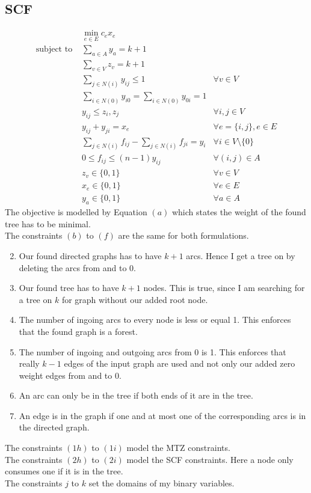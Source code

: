 \documentclass[11pt]{article}
\begin{document}
\subsection{SCF}
\begin{subequations}
\begin{align}
 &\min_{e \in E} c_e x_e&  \\
\text{subject to }  &\sum_{a \in A} y_a = k+1& \\
 &\sum_{v \in V} z_v = k+1  \\
 &\sum_{j \in N(i)} y_{ij} \leq 1  & \forall v \in V \\
 & \sum_{i \in N(0)}y_{i0} = \sum_{i \in N(0)} y_{0i}  = 1  \\
 & y_{ij} \leq z_i, z_j & \forall i,j \in V \\
 & y_{ij} + y_{ji} = x_e & \forall e=\{i,j\}, e \in E \\
 & \sum_{j \in N(i)} f_{ij} - \sum_{j \in N(i)} f_{ji} = y_i & \forall i \in V \setminus{\{0\}}\\	
 & 0 \leq f_{ij} \leq (n-1) y_{ij} & \forall (i,j) \in A \\
 & z_v \in \{0,1\} & \forall v \in V \\
 & x_e \in \{0,1\} & \forall e \in E \\
 & y_a \in \{0,1\} & \forall a \in A 
\end{align}
\end{subequations}
The objective is modelled by Equation $(a)$ which states the weight of the found tree has to be minimal. \\
The constraints $(b)$ to $(f)$ are the same for both formulations.
\begin{enumerate}[label=(\alph*)]
\setcounter{enumi}{1}
\item Our found directed graphs has to have $k+1$ arcs. Hence I get a tree on by deleting the arcs from and to 0.
\item Our found tree has to have $k+1$ nodes. This is true, since I am searching for a tree on $k$ for graph without our added root node.
\item The number of ingoing arcs to every node is less or equal 1. This enforces that the found graph is a forest.
\item The number of ingoing and outgoing arcs from 0 is 1. This enforces that really $k-1$ edges of the input graph are used and not only our added zero weight edges from and to 0.
\item An arc can only be in the tree if both ends of it are in the tree.
\item An edge is in the graph if one and at most one of the corresponding arcs is in the directed graph.
\end{enumerate}
The constraints $(1h)$ to $(1i)$ model the MTZ constraints. \\
The constraints $(2h)$ to $(2i)$ model the SCF constraints. Here a node only consumes one if it is in the tree. \\
The constraints $j$ to $k$ set the domains of my binary variables.
\end{document}
